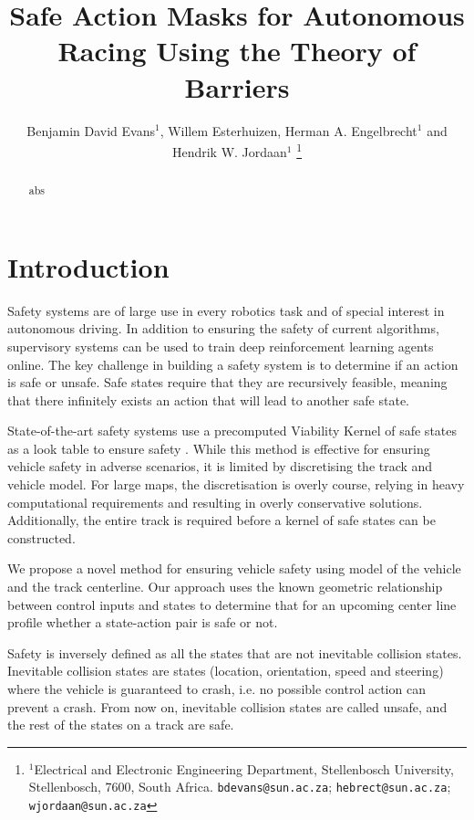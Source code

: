 \documentclass[letterpaper, 10 pt, conference]{ieeeconf}  %
\title{\LARGE \bf
Safe Action Masks for Autonomous Racing Using the Theory of Barriers
}
\author{Benjamin David Evans$^{1}$, Willem Esterhuizen, Herman A. Engelbrecht$^{1}$ and Hendrik W. Jordaan$^{1}$%
\thanks{$^{1}$Electrical and Electronic Engineering Department,
        Stellenbosch University, Stellenbosch, 7600, South Africa. 
        {\tt\small bdevans@sun.ac.za};
        {\tt\small hebrect@sun.ac.za};
        {\tt\small wjordaan@sun.ac.za}%
        }
}
\begin{document}
\maketitle
\thispagestyle{empty}
\pagestyle{empty}


\begin{abstract}
abs


\end{abstract}


\section{Introduction}

Safety systems are of large use in every robotics task and of special interest in autonomous driving. 
In addition to ensuring the safety of current algorithms, supervisory systems can be used to train deep reinforcement learning agents online.
The key challenge in building a safety system is to determine if an action is safe or unsafe.
Safe states require that they are recursively feasible, meaning that there infinitely exists an action that will lead to another safe state.

State-of-the-art safety systems use a precomputed Viability Kernel of safe states as a look table to ensure safety \cite{evans2023safe}.
While this method is effective for ensuring vehicle safety in adverse scenarios, it is limited by discretising the track and vehicle model.
For large maps, the discretisation is overly course, relying in heavy computational requirements and resulting in overly conservative solutions.
Additionally, the entire track is required before a kernel of safe states can be constructed.

We propose a novel method for ensuring vehicle safety using model of the vehicle and the track centerline.
Our approach uses the known geometric relationship between control inputs and states to determine that for an upcoming center line profile whether a state-action pair is safe or not.

Safety is inversely defined as all the states that are not inevitable collision states.
Inevitable collision states are states (location, orientation, speed and steering) where the vehicle is guaranteed to crash, i.e. no possible control action can prevent a crash.
From now on, inevitable collision states are called unsafe, and the rest of the states on a track are safe.
\end{document}
